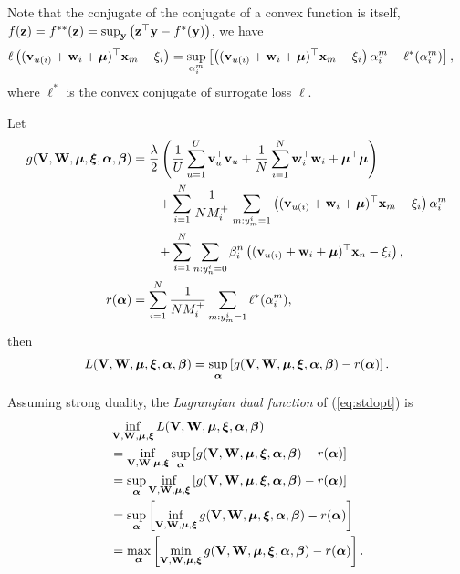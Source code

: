 Note that the conjugate of the conjugate of a convex function is itself, \ie $f(\mathbf{z}) = f^{**}(\mathbf{z}) = \sup_{\mathbf{y}} \left(\mathbf{z}^\top \mathbf{y} - f^*(\mathbf{y}) \right)$, we have
\begin{equation*}
\begin{aligned}
\ell \left( (\mathbf{v}_{u(i)} + \mathbf{w}_i + \bm{\mu})^\top \mathbf{x}_m - \xi_i \right)
&= \sup_{\alpha_i^m} \left[ \left( (\mathbf{v}_{u(i)} + \mathbf{w}_i + \bm{\mu})^\top \mathbf{x}_m - \xi_i \right) \alpha_i^m - \ell^*(\alpha_i^m) \right],
\end{aligned}
\end{equation*}
where $\ell^*$ is the convex conjugate of surrogate loss $\ell$.

Let
\begin{equation*}
\begin{aligned}
g(\mathbf{V}, \mathbf{W}, \bm{\mu}, \bm{\xi}, {\bm{\alpha}}, {\bm{\beta}})
&= \frac{\lambda}{2} \left( \frac{1}{U} \sum_{u=1}^U \mathbf{v}_u^\top \mathbf{v}_u 
     + \frac{1}{N} \sum_{i=1}^N \mathbf{w}_i^\top \mathbf{w}_i + \bm{\mu}^\top \bm{\mu} \right) \\
& \hspace{2em}
     + \sum_{i=1}^N \frac{1}{N M_i^+} \sum_{m: y_m^i = 1} \left( (\mathbf{v}_{u(i)} + \mathbf{w}_i + \bm{\mu})^\top \mathbf{x}_m - \xi_i \right) \alpha_i^m \\
& \hspace{2em}
     + \sum_{i=1}^N \sum_{n: y_n^i = 0} \beta_i^n \left( (\mathbf{v}_{u(i)} + \mathbf{w}_i + \bm{\mu})^\top \mathbf{x}_n - \xi_i \right), \\
r({\bm{\alpha}})
&= \sum_{i=1}^N \frac{1}{N M_i^+} \sum_{m: y_m^i = 1} \ell^*(\alpha_i^m),
\end{aligned}
\end{equation*}
then 
\begin{equation*}
\begin{aligned}
L(\mathbf{V}, \mathbf{W}, \bm{\mu}, \bm{\xi}, {\bm{\alpha}}, {\bm{\beta}}) 
= \sup_{\bm{\alpha}} \left[ g(\mathbf{V}, \mathbf{W}, \bm{\mu}, \bm{\xi}, {\bm{\alpha}}, {\bm{\beta}}) - r({\bm{\alpha}}) \right].
\end{aligned}
\end{equation*}

Assuming strong duality, the \emph{Lagrangian dual function} of (\ref{eq:stdopt}) is
\begin{equation}
\label{eq:dualfunc}
\begin{aligned}
&\inf_{\mathbf{V}, \mathbf{W}, \bm{\mu}, \bm{\xi}} L(\mathbf{V}, \mathbf{W}, \bm{\mu}, \bm{\xi}, {\bm{\alpha}}, {\bm{\beta}}) \\
&= \inf_{\mathbf{V}, \mathbf{W}, \bm{\mu}, \bm{\xi}} \sup_{\bm{\alpha}} \left[ g(\mathbf{V}, \mathbf{W}, \bm{\mu}, \bm{\xi}, {\bm{\alpha}}, {\bm{\beta}}) - r({\bm{\alpha}}) \right] \\
&= \sup_{\bm{\alpha}} \inf_{\mathbf{V}, \mathbf{W}, \bm{\mu}, \bm{\xi}} \left[ g(\mathbf{V}, \mathbf{W}, \bm{\mu}, \bm{\xi}, {\bm{\alpha}}, {\bm{\beta}}) - r({\bm{\alpha}}) \right] \\
&= \sup_{\bm{\alpha}} \left[ \inf_{\mathbf{V}, \mathbf{W}, \bm{\mu}, \bm{\xi}} g(\mathbf{V}, \mathbf{W}, \bm{\mu}, \bm{\xi}, {\bm{\alpha}}, {\bm{\beta}}) - r({\bm{\alpha}}) \right] \\
&= \max_{\bm{\alpha}} \left[ \min_{\mathbf{V}, \mathbf{W}, \bm{\mu}, \bm{\xi}} g(\mathbf{V}, \mathbf{W}, \bm{\mu}, \bm{\xi}, {\bm{\alpha}}, {\bm{\beta}}) - r({\bm{\alpha}}) \right].
\end{aligned}
\end{equation}

